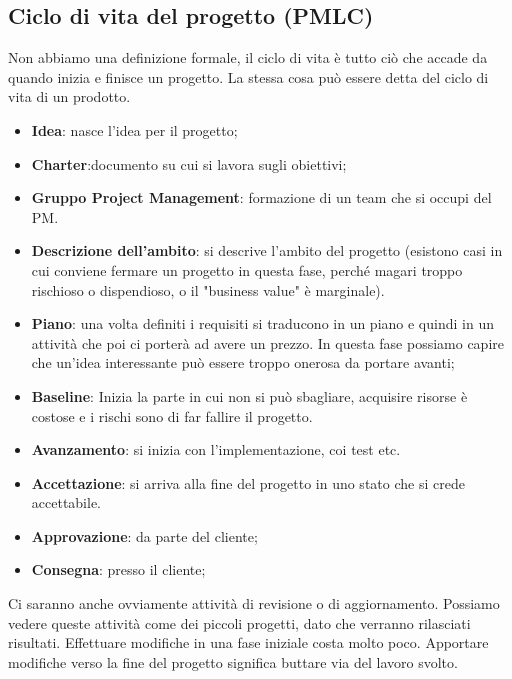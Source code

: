 \subsection{Ciclo di vita del progetto (PMLC)}
Non abbiamo una definizione formale, il ciclo di vita è tutto ciò che accade da quando inizia e finisce un progetto. La stessa cosa può essere detta del ciclo di vita di un prodotto.
\begin{itemize}
	\item \textbf{Idea}: nasce l'idea per il progetto;
	\item \textbf{Charter}:documento su cui si lavora sugli obiettivi;
	\item \textbf{Gruppo Project Management}: formazione di un team che si occupi del PM.
	\item \textbf{Descrizione dell'ambito}: si descrive l'ambito del progetto (esistono casi in cui conviene fermare un progetto in questa fase, perché magari troppo rischioso o dispendioso, o il "business value" è marginale).
	\item \textbf{Piano}: una volta definiti i requisiti si traducono in un piano e quindi in un attività che poi ci porterà ad avere un prezzo. In questa fase possiamo capire che un'idea interessante può essere troppo onerosa da portare avanti;
	\item \textbf{Baseline}: Inizia la parte in cui non si può sbagliare, acquisire risorse è costose e i rischi sono di far fallire il progetto.
	\item \textbf{Avanzamento}: si inizia con l'implementazione, coi test etc.
	\item \textbf{Accettazione}: si arriva alla fine del progetto in uno stato che si crede accettabile.
	\item \textbf{Approvazione}: da parte del cliente;
	\item \textbf{Consegna}: presso il cliente;
\end{itemize}
Ci saranno anche ovviamente attività di revisione o di aggiornamento. Possiamo vedere queste attività come dei piccoli progetti, dato che verranno rilasciati risultati.
\noindent Effettuare modifiche in una fase iniziale costa molto poco. Apportare modifiche verso la fine del progetto significa buttare via del lavoro svolto.

